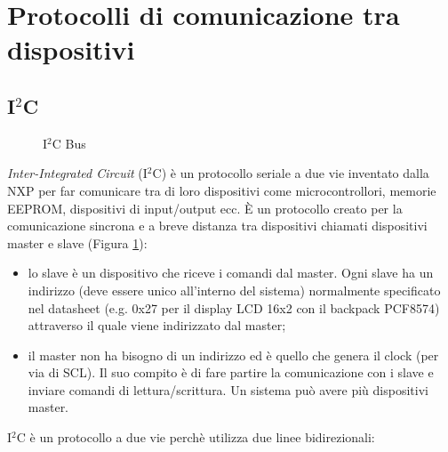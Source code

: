 \documentclass[12pt]{report}
\begin{document}
\section{Protocolli di comunicazione tra dispositivi}
%

%
\subsection{I$^2$C}\label{sec:i2c}
%

\begin{figure}[H]
	\caption{I$^2$C Bus}
	\label{fig:i2c_bus}
\end{figure}

\emph{Inter-Integrated Circuit} (I$^2$C) è un protocollo seriale a due vie inventato dalla NXP per far comunicare tra di loro dispositivi come microcontrollori, memorie EEPROM, dispositivi di input/output ecc. È un protocollo creato per la comunicazione sincrona e a breve distanza tra dispositivi chiamati dispositivi master e slave (Figura \ref{fig:i2c_bus}): 

\begin{itemize}
	\item lo slave è un dispositivo che riceve i comandi dal master. Ogni slave ha un indirizzo (deve essere unico all'interno del sistema) normalmente specificato nel datasheet (e.g$.$ 0x27 per il display LCD 16x2 con il backpack PCF8574) attraverso il quale viene indirizzato dal master;
	\item il master non ha bisogno di un indirizzo ed è quello che genera il clock (per via di SCL). Il suo compito è di fare partire la comunicazione con i slave e inviare comandi di lettura/scrittura. Un sistema può avere più dispositivi master.
\end{itemize}
I$^2$C è un protocollo a due vie perchè utilizza due linee bidirezionali:
\end{document}
